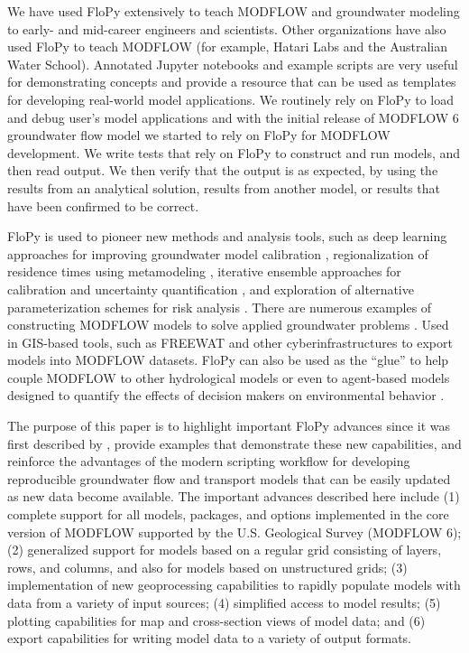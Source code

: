 \documentclass[11pt, oneside]{article}  	%
\begin{document}
We have used FloPy extensively to teach MODFLOW and groundwater modeling to early- and mid-career engineers and scientists. Other organizations have also used FloPy to teach MODFLOW (for example, Hatari Labs and the Australian Water School). Annotated Jupyter notebooks and example scripts are very useful for demonstrating concepts and provide a resource that can be used as templates for developing real-world model applications. We routinely rely on FloPy to load and debug user's model applications and with the initial release of MODFLOW 6 groundwater flow model \citep{modflow6gwf} we started to rely on FloPy for MODFLOW development. We write tests that rely on FloPy to construct and run models, and then read output. We then verify that the output is as expected, by using the results from an analytical solution, results from another model, or results that have been confirmed to be correct.

FloPy is used to pioneer new methods and analysis tools, such as deep learning approaches for improving groundwater model calibration \citep{sun2018, zhou2021}, regionalization of residence times using metamodeling \citep{starn2018}, iterative ensemble approaches for calibration and uncertainty quantification \citep{white2018ies}, and exploration of alternative parameterization schemes for risk analysis \citep{knowling2019}. There are numerous examples of constructing MODFLOW models to solve applied groundwater problems \citep{befus2017, vanengelen2018, ebeling2019, zipper2019, befus2020}. Used in GIS-based tools, such as FREEWAT \citep{freewat2018} and other cyberinfrastructures \citep{essawy2018} to export models into MODFLOW datasets. FloPy can also be used as the ``glue'' to help couple MODFLOW to other hydrological models \citep{burek2020} or even to agent-based models designed to quantify the effects of decision makers on environmental behavior \citep{jaxarozen2019}. 

The purpose of this paper is to highlight important FloPy advances since it was first described by \cite{bakker2016scripting}, provide examples that demonstrate these new capabilities, and reinforce the advantages of the modern scripting workflow for developing reproducible groundwater flow and transport models that can be easily updated as new data become available. The important advances described here include (1) complete support for all models, packages, and options implemented in the core version of MODFLOW supported by the U.S. Geological Survey (MODFLOW 6); (2) generalized support for models based on a regular grid consisting of layers, rows, and columns, and also for models based on unstructured grids; (3) implementation of new geoprocessing capabilities to rapidly populate models with data from a variety of input sources; (4) simplified access to model results; (5) plotting capabilities for map and cross-section views of model data; and (6) export capabilities for writing model data to a variety of output formats.
\end{document}
